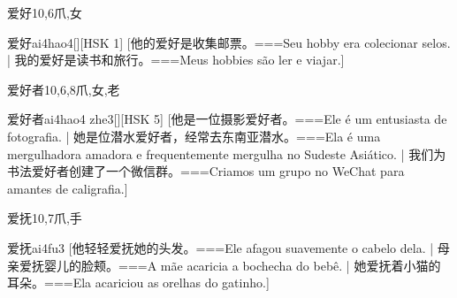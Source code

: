 \begin{Entry}{爱好}{10,6}{⽖,⼥}
  \begin{Phonetics}{爱好}{ai4hao4}[][HSK 1]
    [他的爱好是收集邮票。===Seu hobby era colecionar selos.  | 我的爱好是读书和旅行。===Meus hobbies são ler e viajar.]
  \end{Phonetics}
\end{Entry}

\begin{Entry}{爱好者}{10,6,8}{⽖,⼥,⽼}
  \begin{Phonetics}{爱好者}{ai4hao4 zhe3}[][HSK 5]
    [他是一位摄影爱好者。===Ele é um entusiasta de fotografia. | 她是位潜水爱好者，经常去东南亚潜水。===Ela é uma mergulhadora amadora e frequentemente mergulha no Sudeste Asiático.  | 我们为书法爱好者创建了一个微信群。===Criamos um grupo no WeChat para amantes de caligrafia.]
  \end{Phonetics}
\end{Entry}

\begin{Entry}{爱抚}{10,7}{⽖,⼿}
  \begin{Phonetics}{爱抚}{ai4fu3}
    [他轻轻爱抚她的头发。===Ele afagou suavemente o cabelo dela. | 母亲爱抚婴儿的脸颊。===A mãe acaricia a bochecha do bebê. | 她爱抚着小猫的耳朵。===Ela acariciou as orelhas do gatinho.]
  \end{Phonetics}
\end{Entry}

